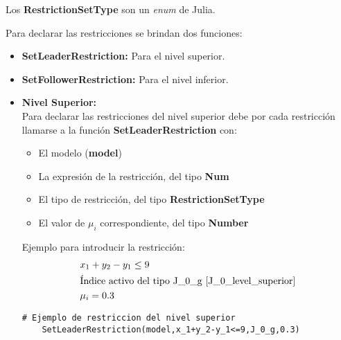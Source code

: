 Los \textbf{RestrictionSetType} son un \textit{enum} de Julia.


Para declarar las restricciones se brindan dos funciones:
\begin{itemize}
    \item \textbf{SetLeaderRestriction:} Para el nivel superior.
    \item \textbf{SetFollowerRestriction:} Para el nivel inferior.
\end{itemize}
\begin{itemize}
    \item \textbf{Nivel Superior:}\\

Para declarar las restricciones del nivel superior debe por cada restricción
llamarse a la función \textbf{SetLeaderRestriction} con:
\begin{itemize}
    \item El modelo (\textbf{model})
    \item La expresión de la restricción, del tipo \textbf{Num}
    \item El tipo de restricción, del tipo \textbf{RestrictionSetType}
    \item El valor de $\mu_i$ correspondiente, del tipo \textbf{Number} 
\end{itemize}

Ejemplo para introducir la restricción:
\begin{align*}
    &x_1+y_2-y_1 \leq 9 \\
    &\text{Índice activo del tipo J\_0\_g \ref{J_0_level_superior}}\\
    & \mu_i=0.3
\end{align*}

\begin{lstlisting}[caption={Introducir restricción del nivel superior}]
    # Ejemplo de restriccion del nivel superior
    SetLeaderRestriction(model,x_1+y_2-y_1<=9,J_0_g,0.3)
\end{lstlisting}



\end{itemize}
